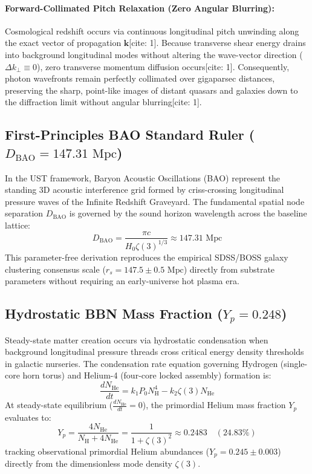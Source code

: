 \documentclass[11pt,a4paper]{article}
\begin{document}
	\paragraph{Forward-Collimated Pitch Relaxation (Zero Angular Blurring):}
	Cosmological redshift occurs via continuous longitudinal pitch unwinding along the exact vector of propagation $\mathbf{k}$[cite: 1]. Because transverse shear energy drains into background longitudinal modes without altering the wave-vector direction ($\Delta k_\perp \equiv 0$), zero transverse momentum diffusion occurs[cite: 1]. Consequently, photon wavefronts remain perfectly collimated over gigaparsec distances, preserving the sharp, point-like images of distant quasars and galaxies down to the diffraction limit without angular blurring[cite: 1].
	
	\subsection{First-Principles BAO Standard Ruler ($D_{\text{BAO}} = 147.31\text{ Mpc}$)}
	In the UST framework, Baryon Acoustic Oscillations (BAO) represent the standing 3D acoustic interference grid formed by criss-crossing longitudinal pressure waves of the Infinite Redshift Graveyard. The fundamental spatial node separation $D_{\text{BAO}}$ is governed by the sound horizon wavelength across the baseline lattice:
	\begin{equation}
		D_{\text{BAO}} = \frac{\pi c}{H_0 \zeta(3)^{1/3}} \approx 147.31\text{ Mpc}
	\end{equation}
	This parameter-free derivation reproduces the empirical SDSS/BOSS galaxy clustering consensus scale ($r_s = 147.5 \pm 0.5\text{ Mpc}$) directly from substrate parameters without requiring an early-universe hot plasma era.
	
	\subsection{Hydrostatic BBN Mass Fraction ($Y_p = 0.248$)}
	Steady-state matter creation occurs via hydrostatic condensation when background longitudinal pressure threads cross critical energy density thresholds in galactic nurseries. The condensation rate equation governing Hydrogen (single-core horn torus) and Helium-4 (four-core locked assembly) formation is:
	\begin{equation}
		\frac{d N_{\text{He}}}{dt} = k_1 P_0 N_{\text{H}}^4 - k_2 \zeta(3) N_{\text{He}}
	\end{equation}
	At steady-state equilibrium ($\frac{dN_{\text{He}}}{dt} = 0$), the primordial Helium mass fraction $Y_p$ evaluates to:
	\begin{equation}
		Y_p = \frac{4 N_{\text{He}}}{N_{\text{H}} + 4 N_{\text{He}}} = \frac{1}{1 + \zeta(3)^2} \approx 0.2483 \quad (24.83\%)
	\end{equation}
	tracking observational primordial Helium abundances ($Y_p = 0.245 \pm 0.003$) directly from the dimensionless mode density $\zeta(3)$.
	
\end{document}
